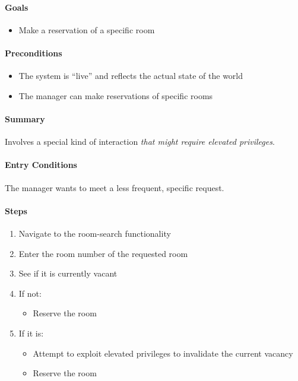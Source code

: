 \paragraph{Goals}\label{goals-2}

\begin{itemize}
\tightlist
\item
  Make a reservation of a specific room
\end{itemize}

\paragraph{Preconditions}\label{preconditions-2}

\begin{itemize}
\tightlist
\item
  The system is ``live'' and reflects the actual state of the world
\item
  The manager can make reservations of specific rooms
\end{itemize}

\paragraph{Summary}\label{summary-2}

Involves a special kind of interaction \emph{that might require elevated
privileges}.

\paragraph{Entry Conditions}\label{entry-conditions-2}

The manager wants to meet a less frequent, specific request.

\paragraph{Steps}\label{steps-2}

\begin{enumerate}
\def\labelenumi{\arabic{enumi}.}
\tightlist
\item
  Navigate to the room-search functionality
\item
  Enter the room number of the requested room
\item
  See if it is currently vacant
\item
  If not:

  \begin{itemize}
  \tightlist
  \item
    Reserve the room
  \end{itemize}
\item
  If it is:

  \begin{itemize}
  \tightlist
  \item
    Attempt to exploit elevated privileges to invalidate the current
    vacancy
  \item
    Reserve the room
  \end{itemize}
\end{enumerate}

